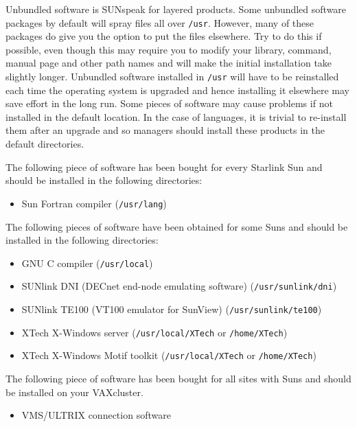 Unbundled software is SUNspeak for layered products.	
Some unbundled software packages by default will spray files all over 
{\tt /usr}.
However, many of these packages do give you the option to put the files
elsewhere. Try to do this if possible, even though this may require you to
modify your library, command, manual page and other path names and will make
the initial installation take slightly longer. Unbundled software installed in
{\tt /usr} will have to be reinstalled each time the operating system is upgraded and
hence installing it elsewhere may save effort in the long run.  
Some pieces of software may cause problems if not
installed in the default location. In the case of languages, it is trivial to
re-install them after an upgrade and so managers should install these products
in the default directories.

The following piece of software has been bought for every Starlink
Sun and should be installed in the following directories:

\begin{itemize}

\item	Sun Fortran compiler ({\tt /usr/lang})

\end{itemize}

The following pieces of software have been obtained for some Suns and should be
installed in the following directories:

\begin{itemize}

\item	GNU C compiler ({\tt /usr/local})
\item	SUNlink DNI (DECnet end-node emulating software) ({\tt /usr/sunlink/dni})
\item	SUNlink TE100  (VT100 emulator for SunView) ({\tt /usr/sunlink/te100})
\item	XTech   X-Windows server ({\tt /usr/local/XTech} or {\tt /home/XTech})
\item	XTech   X-Windows Motif toolkit ({\tt /usr/local/XTech} or {\tt /home/XTech})

\end{itemize}

The following piece of software has been bought for all sites with Suns and
should be installed on your VAXcluster.

\begin{itemize}

\item   VMS/ULTRIX connection software 

\end{itemize}

